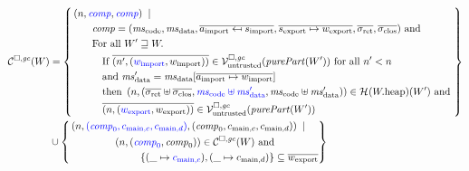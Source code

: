 \begin{jversion}
\begin{definition}
  \label{def:component-rel}
\begin{align*}
  \lrcomp(W) &=
  \left\{\begin{aligned}
     &\npair{\src{\var{comp}},\src{\var{comp}}} \;\mid \;\\
      &\qquad\var{comp} = (\mscode,\msdata,\overline{a_{\mathrm{import}} \mapsfrom s_{\mathrm{import}}},\overline{s_{\mathrm{export}} \mapsto w_{\mathrm{export}}},\sigrets,\sigcloss) \text{ and} \\
      &\qquad\text{For all } W' \future W \ldotp \\
      &\qquad\quad\text{If } \overline{\npair[n']{(\src{w_{\mathrm{import}}},w_{\mathrm{import}})}} \in \lrv(\purePart{W'}) \text{ for all $n' < n$}\\
      &\qquad\quad\text{and } \msdata' = \msdata{}[\overline{a_{\mathrm{import}} \mapsto w_{\mathrm{import}}}] \\
      &\qquad\quad\text{then } \npair{(\sigrets\uplus\sigcloss,\src{\mscode\uplus \msdata'}, \mscode\uplus\msdata')} \in \lrheap(\pwheap)(W') \text{ and }\\
      &\qquad\quad\overline{\npair{(\src{w_{\mathrm{export}}},w_{\mathrm{export}})}} \in \lrv(\purePart{W'})
  \end{aligned}
    \right\}\\
  &\cup \left\{
    \begin{multlined}
     \npair{\src{(\var{comp}_0,c_{\mathrm{main},c}, c_{\mathrm{main},d})},(\var{comp}_0,c_{\mathrm{main},c}, c_{\mathrm{main},d})} \;\mid \;\\
     \npair{(\src{\var{comp}_0},\var{comp}_0)} \in \lrcomp(W) \text{ and}\\
     \{(\_ \mapsto \src{c_{\mathrm{main},c}}),(\_ \mapsto c_{\mathrm{main},d})\} \subseteq \overline{w_{\mathrm{export}}}
       \end{multlined}
    \right\} 
\end{align*}
\end{definition}


\end{jversion}

